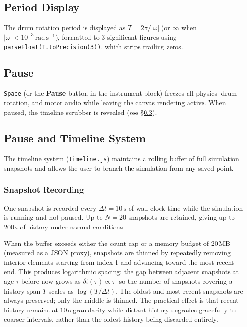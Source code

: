 \documentclass[12pt, a4paper]{article}
\newcommand{\omg}{\omega}
\begin{document}
\subsection{Period Display}

The drum rotation period is displayed as $T = 2\pi/|\omg|$ (or $\infty$ when
$|\omg| < 10^{-3}\,\mathrm{rad\,s^{-1}}$), formatted to 3 significant figures
using \texttt{parseFloat(T.toPrecision(3))}, which strips trailing zeros.

\subsection{Pause}

\texttt{Space} (or the \textbf{Pause} button in the instrument block)
freezes all physics, drum rotation, and motor audio while leaving the canvas
rendering active. When paused, the timeline scrubber is revealed (see
\S\ref{sec:timeline}).

\subsection{Pause and Timeline System}
\label{sec:timeline}

The timeline system (\texttt{timeline.js}) maintains a rolling buffer of full
simulation snapshots and allows the user to branch the simulation from any
saved point.

\subsubsection{Snapshot Recording}

One snapshot is recorded every $\Delta t = 10\,\mathrm{s}$ of wall-clock time
while the simulation is running and not paused. Up to $N = 20$ snapshots are
retained, giving up to $200\,\mathrm{s}$ of history under normal conditions.

When the buffer exceeds either the count cap or a memory budget of
$20\,\mathrm{MB}$ (measured as a JSON proxy), snapshots are thinned by
repeatedly removing interior elements starting from index 1 and advancing
toward the most recent end. This produces logarithmic spacing: the gap between
adjacent snapshots at age $\tau$ before now grows as $\delta t(\tau) \propto
\tau$, so the number of snapshots covering a history span $T$ scales as
$\log(T/\Delta t)$. The oldest and most recent snapshots are always preserved;
only the middle is thinned. The practical effect is that recent history remains
at $10\,\mathrm{s}$ granularity while distant history degrades gracefully to
coarser intervals, rather than the oldest history being discarded entirely.
\end{document}
